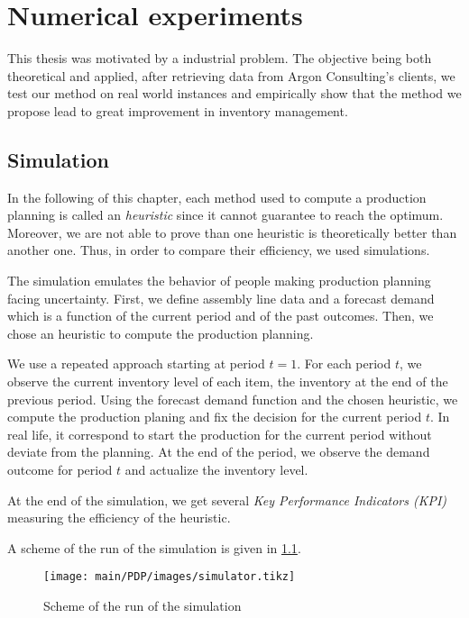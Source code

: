 \chapter{Numerical experiments}
\label{chap:PDP:numerical-experiments}

This thesis was motivated by a industrial problem.
The objective being both theoretical and applied, after retrieving data from Argon Consulting's clients, we test our method on real world instances and empirically show that the method we propose lead to great improvement in inventory management.



\section{Simulation}


In the following of this chapter, each method used to compute a production planning is called an \emph{heuristic} since it cannot guarantee to reach the optimum.
Moreover, we are not able to prove than one heuristic is theoretically better than another one.
Thus, in order to compare their efficiency, we used simulations.


The simulation emulates the behavior of people making production planning facing uncertainty.
First, we define assembly line data and a forecast demand which is a function of the current period and of the past outcomes.
Then, we chose an heuristic to compute the production planning.


We use a repeated approach starting at period $t=1$.
For each period $t$, we observe the current inventory level of each item, \ie the inventory at the end of the previous period.
Using the forecast demand function and the chosen heuristic, we compute the production planing and fix the decision for the current period $t$.
In real life, it correspond to start the production for the current period without deviate from the planning.
At the end of the period, we observe the demand outcome for period $t$ and actualize the inventory level.


At the end of the simulation, we get several \emph{Key Performance Indicators (KPI)} measuring the efficiency of the heuristic.


A scheme of the run of the simulation is given in \cref{fig:simulator}.

\begin{figure}[h]
  \centering
  \texttt{[image: main/PDP/images/simulator.tikz]}
  \caption{Scheme of the run of the simulation}
  \label{fig:simulator}
\end{figure}


